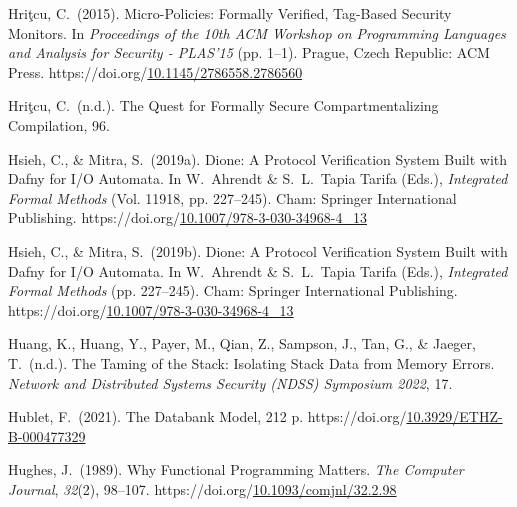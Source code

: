 \documentclass[12pt,twoside]{article}
\begin{document}
{\begin{thebibliography}{1079}
\mdbibitemlabel{}Hriţcu, C.~(2015). Micro-Policies: Formally Verified, Tag-Based Security Monitors. In \emph{Proceedings of the 10th ACM Workshop on Programming Languages and Analysis for Security - PLAS’15} (pp. 1–1). Prague, Czech Republic: ACM Press. https://doi.org/\href{https://dx.doi.org/10.1145/2786558.2786560}{10.1145/2786558.2786560}%

\mdbibitemlabel{}Hriţcu, C.~(n.d.). The Quest for Formally Secure Compartmentalizing Compilation, 96.%

\mdbibitemlabel{}Hsieh, C., \& Mitra, S.~(2019a). Dione: A Protocol Verification System Built with Dafny for I/O Automata. In W.~Ahrendt \& S.~L.~Tapia Tarifa (Eds.), \emph{Integrated Formal Methods} (Vol. 11918, pp. 227–245). Cham: Springer International Publishing. https://doi.org/\href{https://dx.doi.org/10.1007/978-3-030-34968-4_13}{10.1007/978-3-030-34968-4\_13}%

\mdbibitemlabel{}Hsieh, C., \& Mitra, S.~(2019b). Dione: A Protocol Verification System Built with Dafny for I/O Automata. In W.~Ahrendt \& S.~L.~Tapia Tarifa (Eds.), \emph{Integrated Formal Methods} (pp. 227–245). Cham: Springer International Publishing. https://doi.org/\href{https://dx.doi.org/10.1007/978-3-030-34968-4_13}{10.1007/978-3-030-34968-4\_13}%

\mdbibitemlabel{}Huang, K., Huang, Y., Payer, M., Qian, Z., Sampson, J., Tan, G., \& Jaeger, T.~(n.d.). The Taming of the Stack: Isolating Stack Data from Memory Errors. \emph{Network and Distributed Systems Security (NDSS) Symposium 2022}, 17.%

\mdbibitemlabel{}Hublet, F.~(2021). The Databank Model, 212 p. https://doi.org/\href{https://dx.doi.org/10.3929/ETHZ-B-000477329}{10.3929/ETHZ-B-000477329}%

\mdbibitemlabel{}Hughes, J.~(1989). Why Functional Programming Matters. \emph{The Computer Journal}, \emph{32}(2), 98–107. https://doi.org/\href{https://dx.doi.org/10.1093/comjnl/32.2.98}{10.1093/comjnl/32.2.98}%


\end{thebibliography}}
\end{document}
